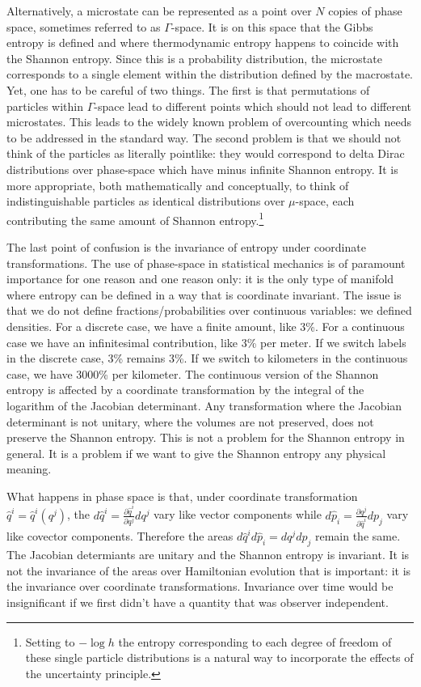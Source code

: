 \documentclass{article}
\begin{document}
Alternatively, a microstate can be represented as a point over $N$ copies of phase space, sometimes referred to as $\Gamma$-space. It is on this space that the Gibbs entropy is defined and where thermodynamic entropy happens to coincide with the Shannon entropy. Since this is a probability distribution, the microstate corresponds to a single element within the distribution defined by the macrostate. Yet, one has to be careful of two things. The first is that permutations of particles within $\Gamma$-space lead to different points which should not lead to different microstates. This leads to the widely known problem of overcounting which needs to be addressed in the standard way. The second problem is that we should not think of the particles as literally pointlike: they would correspond to delta Dirac distributions over phase-space which have minus infinite Shannon entropy. It is more appropriate, both mathematically and conceptually, to think of indistinguishable particles as identical distributions over $\mu$-space, each contributing the same amount of Shannon entropy.\footnote{Setting to $-\log h$ the entropy corresponding to each degree of freedom of these single particle distributions is a natural way to incorporate the effects of the uncertainty principle.}

The last point of confusion is the invariance of entropy under coordinate transformations. The use of phase-space in statistical mechanics is of paramount importance for one reason and one reason only: it is the only type of manifold where entropy can be defined in a way that is coordinate invariant. The issue is that we do not define fractions/probabilities over continuous variables: we defined densities. For a discrete case, we have a finite amount, like 3\%. For a continuous case we have an infinitesimal contribution, like 3\% per meter. If we switch labels in the discrete case, 3\% remains 3\%. If we switch to kilometers in the continuous case, we have 3000\% per kilometer. The continuous version of the Shannon entropy is affected by a coordinate transformation by the integral of the logarithm of the Jacobian determinant. Any transformation where the Jacobian determinant is not unitary, where the volumes are not preserved, does not preserve the Shannon entropy. This is not a problem for the Shannon entropy in general. It is a problem if we want to give the Shannon entropy any physical meaning.

What happens in phase space is that, under coordinate transformation $\hat{q}^i = \hat{q}^i(q^j)$, the $d\hat{q}^i = \frac{\partial \hat{q}^i}{\partial q^j } dq^j$ vary like vector components while $d\hat{p}_i = \frac{\partial q^j}{\partial \hat{q}^i } dp_j$ vary like covector components. Therefore the areas $d\hat{q}^i d\hat{p}_i = dq^j dp_j$ remain the same. The Jacobian determiants are unitary and the Shannon entropy is invariant. It is not the invariance of the areas over Hamiltonian evolution that is important: it is the invariance over coordinate transformations. Invariance over time would be insignificant if we first didn't have a quantity that was observer independent.
\end{document}
